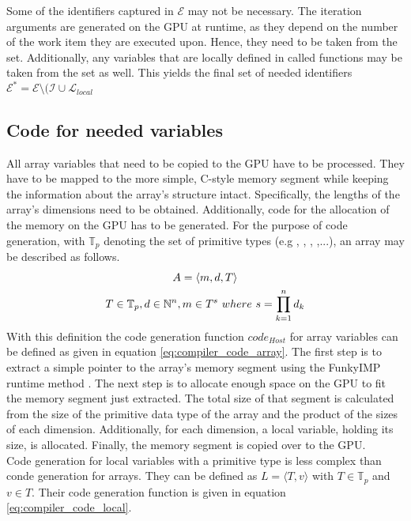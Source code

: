 Some of the identifiers captured in $\mathcal{E}$ may not be necessary. The iteration arguments are generated on the GPU at runtime, as they depend on the number of the work item they are executed upon. Hence, they need to be taken from the set. Additionally, any variables that are locally defined in called functions may be taken from the set as well. This yields the final set of needed identifiers $\mathcal{E}^* = \mathcal{E} \setminus (\mathcal{I} \cup \mathcal{L}_{local}$


\subsection{Code for needed variables}
\label{sect:compiler_variable_init}
All array variables that need to be copied to the GPU have to be processed. They have to be mapped to the more simple, C-style memory segment while keeping the information about the array's structure intact. Specifically, the lengths of the array's dimensions need to be obtained. Additionally, code for the allocation of the memory on the GPU has to be generated. For the purpose of code generation, with $\mathbb{T}_p$ denoting the set of primitive types (e.g , , , ,...), an array may be described as follows.
\begin{gather*}
	A = \langle m, d, T \rangle \\
	T \in \mathbb{T}_p, d \in \mathbb{N}^n, m \in T^{s}\ where\ s = \prod_{k=1}^n d_k
\end{gather*}
With this definition the code generation function $code_{Host}$ for array variables can be defined as given in equation \ref{eq:compiler_code_array}. The first step is to extract a simple pointer to the array's memory segment using the FunkyIMP runtime method . The next step is to allocate enough space on the GPU to fit the memory segment just extracted. The total size of that segment is calculated from the size of the primitive data type of the array and the product of the sizes of each dimension. Additionally, for each dimension, a local variable, holding its size, is allocated. Finally, the memory segment is copied over to the GPU. \\

Code generation for local variables with a primitive type is less complex than conde generation for arrays. They can be defined as $L = \langle T, v\rangle$ with $T \in \mathbb{T}_p$ and $v\in T$. Their code generation function is given in equation \ref{eq:compiler_code_local}.\\


